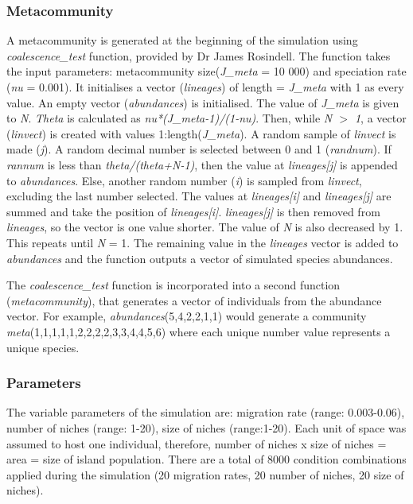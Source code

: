 \documentclass{article}
\begin{document}
\subsubsection{Metacommunity}
A metacommunity is generated at the beginning of the simulation using \textit{coalescence\_test} function, provided by Dr James Rosindell. The function takes the input parameters: metacommunity size(\textit{J\_meta} = 10 000) and speciation rate (\textit{nu} = 0.001). It initialises a vector (\textit{lineages}) of length = \textit{J\_meta} with 1 as every value. An empty vector (\textit{abundances}) is initialised. The value of \textit{J\_meta} is given to \textit{N}. \textit{Theta} is calculated as \textit{nu*(J\_meta-1)/(1-nu)}. Then, while \textit{N $>$ 1}, a vector (\textit{linvect}) is created with values 1:length(\textit{J\_meta}). A random sample of \textit{linvect} is made (\textit{j}). A random decimal number is selected between 0 and 1 (\textit{randnum}). If \textit{rannum} is less than \textit{theta/(theta+N-1)}, then the value at \textit{lineages[j]} is appended to \textit{abundances}. Else, another random number (\textit{i}) is sampled from \textit{linvect}, excluding the last number selected. The values at \textit{lineages[i]} and \textit{lineages[j]} are summed and take the position of \textit{lineages[i]}. \textit{lineages[j]} is then removed from \textit{lineages}, so the vector is one value shorter. The value of \textit{N} is also decreased by 1. This repeats until \textit{N} = 1. The remaining value in the \textit{lineages} vector is added to \textit{abundances} and the function outputs a vector of simulated species abundances.\bigskip

\noindent The \textit{coalescence\_test} function is incorporated into a second function (\textit{metacommunity}), that generates a vector of individuals from the abundance vector. For example, \textit{abundances}(5,4,2,2,1,1) would generate a community \textit{meta}(1,1,1,1,1,2,2,2,2,3,3,4,4,5,6) where each unique number value represents a unique species.\bigskip     

\subsubsection{Parameters}
The variable parameters of the simulation are: migration rate (range: 0.003-0.06), number of niches (range: 1-20), size of niches (range:1-20). Each unit of space was assumed to host one individual, therefore, number of niches x size of niches = area = size of island population. There are a total of 8000 condition combinations applied during the simulation (20 migration rates, 20 number of niches, 20 size of niches). 
\end{document}
